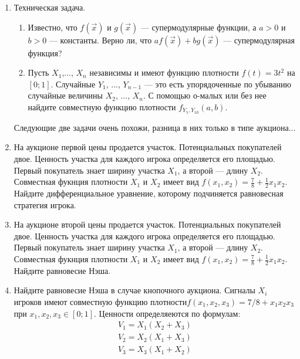 \documentclass[pdftex,12pt,a4paper]{article}
\begin{document}
\begin{enumerate}

\item Техническая задача. 
\begin{enumerate}
\item Известно, что $ f(\vec{x}) $ и $ g(\vec{x}) $ --- супермодулярные функции, а $ a>0 $ и $ b>0 $ --- константы. Верно ли, что $ af(\vec{x})+bg(\vec{x}) $ --- супермодулярная функция?
\item Пусть $ X_{1} $,..., $ X_{n} $ независимы и имеют функцию плотности $ f(t)=3t^{2} $ на $ [0;1] $. Случайные $ Y_{1} $, ..., $ Y_{n-1} $ --- это есть упорядоченные по убыванию случайные величины $ X_{2} $, ..., $ X_{n} $. С помощью о-малых или без нее найдите совместную функцию плотности $ f_{Y_{5},Y_{10}}(a,b) $.
\end{enumerate}

Следующие две задачи очень похожи, разница в них только в типе аукциона...

\item На аукционе первой цены продается участок. Потенциальных покупателей двое. Ценность участка для каждого игрока определяется его площадью. Первый покупатель знает ширину участка $ X_{1} $, а второй --- длину $X_{2}$. Совместная фукнция плотности $ X_{1} $ и $ X_{2} $ имеет вид $ f(x_{1},x_{2})=\frac{7}{8}+\frac{1}{2}x_{1}x_{2} $. Найдите дифференциальное уравнение, которому подчиняется равновесная стратегия игрока. 

\item На аукционе второй цены продается участок. Потенциальных покупателей двое. Ценность участка для каждого игрока определяется его площадью. Первый покупатель знает ширину участка $ X_{1} $, а второй --- длину $X_{2}$. Совместная фукнция плотности $ X_{1} $ и $ X_{2} $ имеет вид $ f(x_{1},x_{2})=\frac{7}{8}+\frac{1}{2}x_{1}x_{2} $. Найдите равновесие Нэша.


\item Найдите равновесие Нэша в случае кнопочного аукциона. Сигналы $ X_{i} $ игроков имеют совместную функцию плотности$ f(x_{1},x_{2},x_{3})=7/8+x_{1}x_{2}x_{3} $ при $ x_{1},x_{2},x_{3}\in[0;1] $. Ценности определяеются по формулам:
\begin{equation}
\begin{array}{c}
V_{1}=X_{1}(X_{2}+X_{3}) \\
V_{2}=X_{2}(X_{1}+X_{3}) \\
V_{3}=X_{3}(X_{1}+X_{2}) 
\end{array}
\end{equation}


\end{enumerate}
\end{document}
